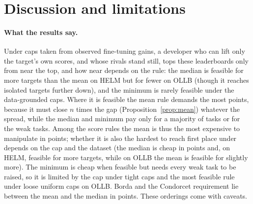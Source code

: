 \documentclass{article}
\begin{document}
\section{Discussion and limitations}
\label{sec:disc}
\paragraph{What the results say.}
Under caps taken from observed fine-tuning gains, a developer who can lift only the target's own scores, and whose rivals stand still, tops these leaderboards only from near the top, and how near depends on the rule: the median is feasible for more targets than the mean on HELM but for fewer on OLLB (though it reaches isolated targets further down), and the minimum is rarely feasible under the data-grounded caps. Where it is feasible the mean rule demands the most points, because it must close $n$ times the gap (Proposition~\ref{prop:mean}) whatever the spread, while the median and minimum pay only for a majority of tasks or for the weak tasks. Among the score rules the mean is thus the most expensive to manipulate in points; whether it is also the hardest to reach first place under depends on the cap and the dataset (the median is cheap in points and, on HELM, feasible for more targets, while on OLLB the mean is feasible for slightly more). The minimum is cheap when feasible but needs every weak task to be raised, so it is limited by the cap under tight caps and the most feasible rule under loose uniform caps on OLLB. Borda and the Condorcet requirement lie between the mean and the median in points. These orderings come with caveats.
\end{document}
